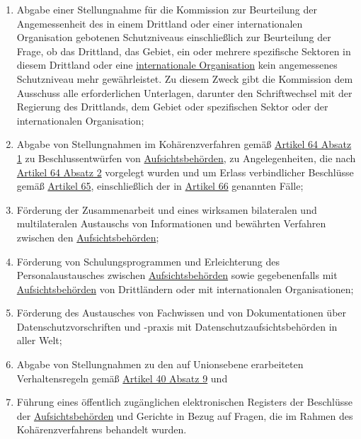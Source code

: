 \begin{enumerate}
\begin{enumerate}
    \item Abgabe einer Stellungnahme für die Kommission zur Beurteilung der Angemessenheit des in einem Drittland oder
     einer internationalen Organisation gebotenen Schutzniveaus einschließlich zur Beurteilung der Frage, ob das
     Drittland, das Gebiet, ein oder mehrere spezifische Sektoren in diesem Drittland oder eine \hyperref[itm:04-26]
     {internationale Organisation} kein angemessenes Schutzniveau mehr gewährleistet. Zu diesem Zweck gibt die
     Kommission dem Ausschuss alle erforderlichen Unterlagen, darunter den Schriftwechsel mit der Regierung des
     Drittlands, dem Gebiet oder spezifischen Sektor oder der internationalen Organisation;%
    \label{itm:70-1s}

    \item Abgabe von Stellungnahmen im Kohärenzverfahren gemäß \hyperref[itm:64-1]{Artikel 64 Absatz 1} zu
     Beschlussentwürfen von \hyperref[itm:04-21]{Aufsichtsbehörden}, zu Angelegenheiten, die nach \hyperref[itm:64-2]
     {Artikel 64 Absatz 2} vorgelegt wurden und um Erlass verbindlicher Beschlüsse gemäß \hyperref[ch:65]{Artikel 65},
     einschließlich der in \hyperref[ch:66]{Artikel 66} genannten Fälle;%
    \label{itm:70-1t}

    \item Förderung der Zusammenarbeit und eines wirksamen bilateralen und multilateralen Austauschs von Informationen
     und bewährten Verfahren zwischen den \hyperref[itm:04-21]{Aufsichtsbehörden};%
    \label{itm:70-1u}

    \item Förderung von Schulungsprogrammen und Erleichterung des Personalaustausches zwischen \hyperref[itm:04-21]
     {Aufsichtsbehörden} sowie gegebenenfalls mit \hyperref[itm:04-21]{Aufsichtsbehörden} von Drittländern oder mit
     internationalen Organisationen;%
    \label{itm:70-1v}

    \item Förderung des Austausches von Fachwissen und von Dokumentationen über Datenschutzvorschriften und -praxis mit
     Datenschutzaufsichtsbehörden in aller Welt;%
    \label{itm:70-1w}

    \item Abgabe von Stellungnahmen zu den auf Unionsebene erarbeiteten Verhaltensregeln gemäß \hyperref[itm:40-9]
     {Artikel 40 Absatz 9} und%
    \label{itm:70-1x}

    \item Führung eines öffentlich zugänglichen elektronischen Registers der Beschlüsse der \hyperref[itm:04-21]{Aufsichtsbehörden} und Gerichte in Bezug auf Fragen, die
     im Rahmen des Kohärenzverfahrens behandelt wurden.%
    \label{itm:70-1y}


\end{enumerate}
\end{enumerate}
